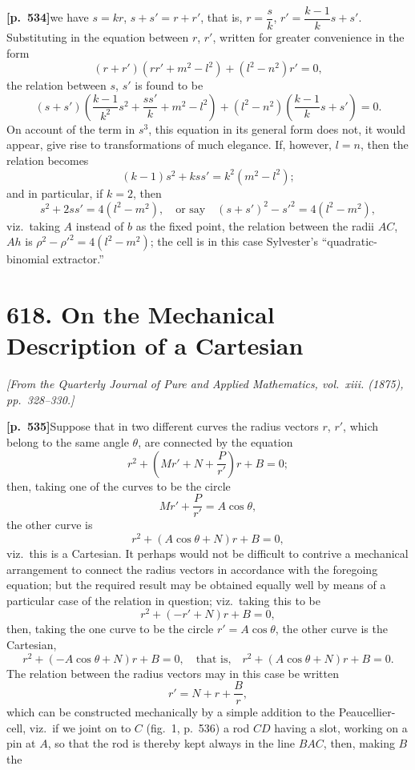 \documentclass[11pt,a4paper]{article}
\begin{document}
\bigskip

\noindent\textbf{[p.~534]}\quad we have $s = kr$, $s + s' = r + r'$, that is, $r = \dfrac{s}{k}$, $r' = \dfrac{k - 1}{k}s + s'$. Substituting in the equation between $r$, $r'$, written for greater convenience in the form
\[
(r + r')(r r' + m^{2} - l^{2}) + (l^{2} - n^{2}) r' = 0,
\]
the relation between $s$, $s'$ is found to be
\[
(s + s')\left( \frac{k - 1}{k^{2}}s^{2} + \frac{s s'}{k} + m^{2} - l^{2} \right) + (l^{2} - n^{2})\left( \frac{k - 1}{k}s + s' \right) = 0.
\]
On account of the term in $s^{3}$, this equation in its general form does not, it would appear, give rise to transformations of much elegance. If, however, $l = n$, then the relation becomes
\[
(k - 1) s^{2} + k s s' = k^{2}(m^{2} - l^{2});
\]
and in particular, if $k = 2$, then
\[
s^{2} + 2 s s' = 4(l^{2} - m^{2}),\quad \text{or say}\quad (s + s')^{2} - s'^{2} = 4(l^{2} - m^{2}),
\]
viz.\ taking $A$ instead of $b$ as the fixed point, the relation between the radii $AC$, $Ah$ is $\rho^{2} - \rho'^{2} = 4(l^{2} - m^{2})$; the cell is in this case Sylvester's ``quadratic-binomial extractor.''

\bigskip

\section*{\textbf{618.} On the Mechanical Description of a Cartesian}

\textit{[From the Quarterly Journal of Pure and Applied Mathematics, vol.~xiii. (1875), pp.~328--330.]}

\bigskip

\noindent\textbf{[p.~535]}\quad Suppose that in two different curves the radius vectors $r$, $r'$, which belong to the same angle $\theta$, are connected by the equation
\[
r^{2} + \left( M r' + N + \frac{P}{r'} \right) r + B = 0;
\]
then, taking one of the curves to be the circle
\[
M r' + \frac{P}{r'} = A \cos\theta,
\]
the other curve is
\[
r^{2} + (A \cos\theta + N) r + B = 0,
\]
viz.\ this is a Cartesian. It perhaps would not be difficult to contrive a mechanical arrangement to connect the radius vectors in accordance with the foregoing equation; but the required result may be obtained equally well by means of a particular case of the relation in question; viz.\ taking this to be
\[
r^{2} + (-r' + N) r + B = 0,
\]
then, taking the one curve to be the circle $r' = A\cos\theta$, the other curve is the Cartesian,
\[
r^{2} + (-A\cos\theta + N) r + B = 0,\quad \text{that is,}\quad r^{2} + (A\cos\theta + N) r + B = 0.
\]
The relation between the radius vectors may in this case be written
\[
r' = N + r + \frac{B}{r},
\]
which can be constructed mechanically by a simple addition to the Peaucellier-cell, viz.\ if we joint on to $C$ (fig.~1, p.~536) a rod $CD$ having a slot, working on a pin at $A$, so that the rod is thereby kept always in the line $BAC$, then, making $B$ the
\end{document}
